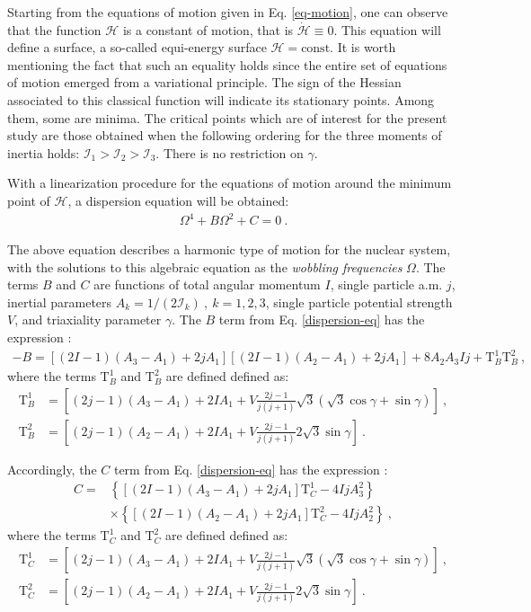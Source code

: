 \documentclass[11pt]{article}
\begin{document}
Starting from the equations of motion given in Eq. \ref{eq-motion}, one can observe that the function $\mathcal{H}$ is a constant of motion, that is $\dot{\mathcal{H}}\equiv0$. This equation will define a surface, a so-called equi-energy surface $\mathcal{H}=\text{const}$. It is worth mentioning the fact that such an equality holds since the entire set of equations of motion emerged from a variational principle. The sign of the Hessian associated to this classical function will indicate its stationary points. Among them, some are minima. The critical points which are of interest for the present study are those obtained when the following ordering for the three moments of inertia holds: $\mathcal{I}_1>\mathcal{I}_2>\mathcal{I}_3$. There is no restriction on $\gamma$.

With a linearization procedure for the equations of motion around the minimum point  of $\mathcal{H}$, a dispersion equation will be obtained:
\begin{align}
    \Omega^4+B\Omega^2+C=0\ .
    \label{dispersion-eq}
\end{align}

The above equation describes a harmonic type of motion for the nuclear system, with the solutions to this algebraic equation as the \emph{wobbling frequencies} $\Omega$. The terms $B$ and $C$ are  functions of total angular momentum $I$, single particle a.m. $j$, inertial parameters $A_k=1/(2\mathcal{I}_k)\ ,\ k=1,2,3$, single particle potential strength $V$, and triaxiality parameter $\gamma$.  The $B$ term from Eq. \ref{dispersion-eq} has the expression \cite{raduta2020approach}:
\begin{align}
 -B=\left[(2I-1)(A_3-A_1)+2jA_1\right]\left[(2I-1)(A_2-A_1)+2jA_1\right]+8A_2A_3Ij+\text{T}_B^1\text{T}_B^2\ ,
 \label{b_term}
 \end{align}
 where the terms $\text{T}_B^1$ and $\text{T}_B^2$ are defined defined as:
 \begin{align}
 \text{T}_B^1&=\left[(2j-1)(A_3-A_1)+2IA_1+V\frac{2j-1}{j(j+1)}\sqrt{3}(\sqrt{3}\cos\gamma+\sin\gamma)\right]\ , \nonumber \\
 \text{T}_B^2&=\left[(2j-1)(A_2-A_1)+2IA_1+V\frac{2j-1}{j(j+1)}2\sqrt{3}\sin\gamma\right]\ .
 \label{b_term-plus}
\end{align}

Accordingly, the $C$ term from Eq. \ref{dispersion-eq} has the expression \cite{raduta2020approach}:
\begin{align}
    C=&\left\{\left[(2I-1)(A_3-A_1)+2jA_1\right]\text{T}_C^1
- 4IjA_3^2\right \} \nonumber\\
      &\times\left\{\left[(2I-1)(A_2-A_1)+2jA_1\right]\text{T}_C^2-4IjA_2^2\right\}\ ,
      \label{c_term}
\end{align}
where the terms $\text{T}_C^1$ and $\text{T}_C^2$ are defined defined as:
\begin{align}
    \text{T}_C^1&=\left[(2j-1)(A_3-A_1)+2IA_1+V\frac{2j-1}{j(j+1)}\sqrt{3}(\sqrt{3}\cos\gamma+\sin\gamma)\right]\ , \nonumber\\
    \text{T}_C^2&=\left[(2j-1)(A_2-A_1)+2IA_1+V\frac{2j-1}{j(j+1)}2\sqrt{3}\sin\gamma\right]\ . 
    \label{c_term-plus}
\end{align}
\end{document}
